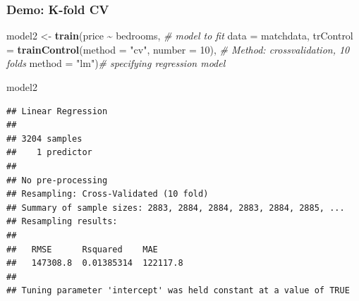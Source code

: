 \documentclass[
  shownotes,
  xcolor={svgnames},
  hyperref={colorlinks,citecolor=DarkBlue,linkcolor=DarkRed,urlcolor=DarkBlue}
  ]{beamer}
\newenvironment{Shaded}{\begin{snugshade}}{\end{snugshade}}
\newcommand{\CommentTok}[1]{\textcolor[rgb]{0.56,0.35,0.01}{\textit{#1}}}
\newcommand{\DataTypeTok}[1]{\textcolor[rgb]{0.13,0.29,0.53}{#1}}
\newcommand{\DecValTok}[1]{\textcolor[rgb]{0.00,0.00,0.81}{#1}}
\newcommand{\KeywordTok}[1]{\textcolor[rgb]{0.13,0.29,0.53}{\textbf{#1}}}
\newcommand{\NormalTok}[1]{#1}
\newcommand{\OperatorTok}[1]{\textcolor[rgb]{0.81,0.36,0.00}{\textbf{#1}}}
\newcommand{\StringTok}[1]{\textcolor[rgb]{0.31,0.60,0.02}{#1}}
\begin{document}
\begin{frame}[fragile]
\frametitle{Demo: K-fold CV}

\begin{scriptsize}
\begin{Shaded}
\begin{Highlighting}[]
\NormalTok{model2 \textless{}{-}}\StringTok{ }\KeywordTok{train}\NormalTok{(price }\OperatorTok{\textasciitilde{}}\StringTok{ }\NormalTok{bedrooms,   }\CommentTok{\# model to fit}
                     \DataTypeTok{data =}\NormalTok{ matchdata,                        }
                     \DataTypeTok{trControl =} \KeywordTok{trainControl}\NormalTok{(}\DataTypeTok{method =} \StringTok{"cv"}\NormalTok{, }\DataTypeTok{number =} \DecValTok{10}\NormalTok{),     }
                     \CommentTok{\# Method: crossvalidation, 10 folds}
                     \DataTypeTok{method =} \StringTok{"lm"}\NormalTok{)}\CommentTok{\# specifying regression model}

\NormalTok{model2}
\end{Highlighting}
\end{Shaded}
\end{scriptsize}
\begin{tiny}
\begin{verbatim}
## Linear Regression 
## 
## 3204 samples
##    1 predictor
## 
## No pre-processing
## Resampling: Cross-Validated (10 fold) 
## Summary of sample sizes: 2883, 2884, 2884, 2883, 2884, 2885, ... 
## Resampling results:
## 
##   RMSE      Rsquared    MAE     
##   147308.8  0.01385314  122117.8
## 
## Tuning parameter 'intercept' was held constant at a value of TRUE
\end{verbatim}
\end{tiny}
\end{frame}
\end{document}
